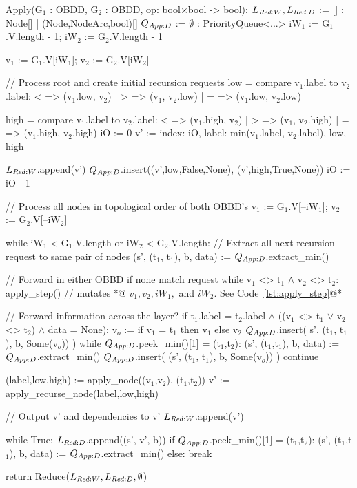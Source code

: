 \begin{blstlisting}
  Apply(G$_1$ : OBDD, G$_2$ : OBDD, op: bool$\times$bool -> bool):
     $\ReduceLwork, \ReduceLdep$ := [] : Node[] | (Node,NodeArc,bool)[]
     $\ApplyQrec$ := $\emptyset$ : PriorityQueue<...>
     iW$_1$ := G$_1$.V.length - 1; iW$_2$ := G$_2$.V.length - 1

     v$_1$ := G$_1$.V[iW$_1$]; v$_2$ := G$_2$.V[iW$_2$]

     // Process root and create initial recursion requests
     low = compare v$_1$.label to v$_2$.label:  <  => (v$_1$.low, v$_2$)
                                       | > => (v$_1$, v$_2$.low)
                                       | = => (v$_1$.low, v$_2$.low)

     high = compare v$_1$.label to v$_2$.label:  <  => (v$_1$.high, v$_2$)
                                        | > => (v$_1$, v$_2$.high)
                                        | = => (v$_1$.high, v$_2$.high)
     iO := 0
     v' := { index: iO, label: min(v$_1$.label, v$_2$.label), low, high }

     $\ReduceLwork$.append(v')
     $\ApplyQrec$.insert((v',low,False,None), (v',high,True,None))
     iO := iO - 1

     // Process all nodes in topological order of both OBBD's
     v$_1$ := G$_1$.V[--iW$_1$]; v$_2$ := G$_2$.V[--iW$_2$]

     while iW$_1$ < G$_1$.V.length or iW$_2$ < G$_2$.V.length:
         // Extract all next recursion request to same pair of nodes
         (s', (t$_1$, t$_1$), b, data) := $\ApplyQrec$.extract_min()

         // Forward in either OBBD if none match request
         while v$_1$ <> t$_1$ $\land$ v$_2$ <> t$_2$:
            apply_step() // mutates *@\color{gray} $v_1, v_2, \mathit{iW}_1,$ and $\mathit{iW}_2$. See Code~\ref{lst:apply_step}@*

         // Forward information across the layer?
         if t$_1$.label = t$_2$.label $\land$ ((v$_1$ <> t$_1$ $\lor$ v$_2$ <> t$_2$) $\land$ data = None):
             v$_o$ := if v$_1$ = t$_1$ then v$_1$ else v$_2$
             $\ApplyQrec$.insert( s', (t$_1$, t$_1$), b, Some(v$_o$)) )
             while $\ApplyQrec$.peek_min()[1] = (t$_1$,t$_2$):
                 (s', (t$_1$,t$_1$), b, data) := $\ApplyQrec$.extract_min()
                 $\ApplyQrec$.insert( (s', (t$_1$, t$_1$), b, Some(v$_o$)) )
             continue

         (label,low,high) := apply_node((v$_1$,v$_2$), (t$_1$,t$_2$))
         v' := apply_recurse_node(label,low,high)

         // Output v' and dependencies to v'
         $\ReduceLwork$.append(v')

         while True:
             $\ReduceLdep$.append((s', v', b))
             if $\ApplyQrec$.peek_min()[1] = (t$_1$,t$_2$):
                 (s', (t$_1$,t$_1$), b, data) := $\ApplyQrec$.extract_min()
             else: break

     return Reduce($\ReduceLwork, \ReduceLdep, \emptyset$)
\end{blstlisting}
